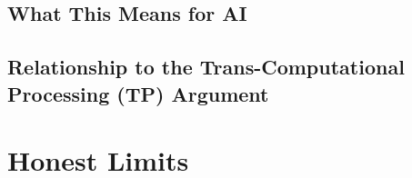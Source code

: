 \documentclass[11pt]{article}
\begin{document}
\subsection{What This Means for AI}


\subsection{Relationship to the Trans-Computational Processing (TP) Argument}

%

\section{Honest Limits}
\label{sec:limits}

\end{document}
